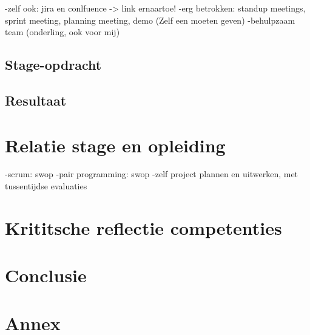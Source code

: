 \documentclass[10pt,a4paper]{article}
\begin{document}
-zelf ook: jira en conlfuence -> link ernaartoe!
-erg betrokken: standup meetings, sprint meeting, planning meeting, demo (Zelf een moeten geven)
-behulpzaam team (onderling, ook voor mij)
\subsection{Stage-opdracht}
\subsection{Resultaat}

\section{Relatie stage en opleiding}
-scrum: swop
-pair programming: swop
-zelf project plannen en uitwerken, met tussentijdse evaluaties
\section{Krititsche reflectie competenties}

\section{Conclusie}

\section{Annex}
\end{document}
